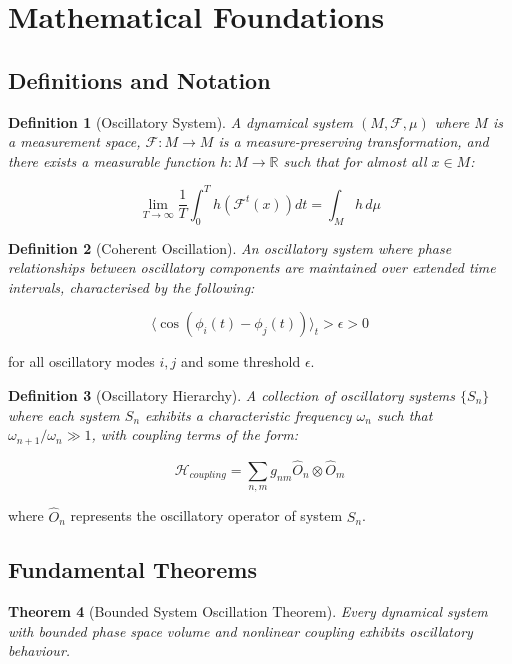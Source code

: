 \documentclass[11pt]{article}
\newtheorem{theorem}{Theorem}[section]
\newtheorem{definition}[theorem]{Definition}
\theoremstyle{remark}
\begin{document}
\section{Mathematical Foundations}

\subsection{Definitions and Notation}

\begin{definition}[Oscillatory System]
A dynamical system $(M, \mathcal{F}, \mu)$ where $M$ is a measurement space, $\mathcal{F}: M \to M$ is a measure-preserving transformation, and there exists a measurable function $h: M \to \mathbb{R}$ such that for almost all $x \in M$:
\end{definition}

$$\lim_{T \to \infty} \frac{1}{T}\int_0^T h(\mathcal{F}^t(x)) dt = \int_M h \, d\mu$$

\begin{definition}[Coherent Oscillation]
An oscillatory system where phase relationships between oscillatory components are maintained over extended time intervals, characterised by the following:
\end{definition}

$$\langle\cos(\phi_i(t) - \phi_j(t))\rangle_t > \epsilon > 0$$

for all oscillatory modes $i, j$ and some threshold $\epsilon$.

\begin{definition}[Oscillatory Hierarchy]
A collection of oscillatory systems $\{S_n\}$ where each system $S_n$ exhibits a characteristic frequency $\omega_n$ such that $\omega_{n+1}/\omega_n \gg 1$, with coupling terms of the form:
\end{definition}

$$\mathcal{H}_{coupling} = \sum_{n,m} g_{nm} \hat{O}_n \otimes \hat{O}_m$$

where $\hat{O}_n$ represents the oscillatory operator of system $S_n$.

\subsection{Fundamental Theorems}

\begin{theorem}[Bounded System Oscillation Theorem]
Every dynamical system with bounded phase space volume and nonlinear coupling exhibits oscillatory behaviour.
\end{theorem}
\end{document}
